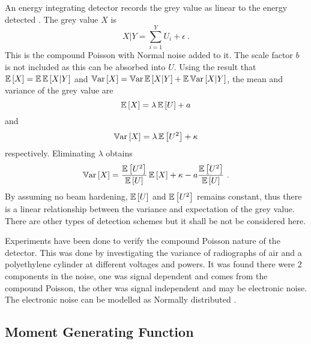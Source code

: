 An energy integrating detector records the grey value as linear to the energy detected \citep{whiting2006properties}. The grey value $X$ is
\begin{equation}
X|Y = \sum_{i=1}^Y U_i + \epsilon \ .
\end{equation}
This is the compound Poisson with Normal noise added to it. The scale factor $b$ is not included as this can be absorbed into $U$. Using the result that $\operatorname{\mathbb{E}}\left[X\right]=\operatorname{\mathbb{E}}\operatorname{\mathbb{E}}\left[X|Y\right]$ and $\operatorname{\mathbb{V}ar}\left[X\right] = \operatorname{\mathbb{V}ar}\operatorname{\mathbb{E}}\left[X|Y\right] + \operatorname{\mathbb{E}}\operatorname{\mathbb{V}ar}\left[X|Y\right]$, the mean and variance of the grey value are
\begin{equation}
\operatorname{\mathbb{E}}\left[X\right] = \lambda\operatorname{\mathbb{E}}\left[U\right]+a
\end{equation}
and
\begin{equation}
\operatorname{\mathbb{V}ar}\left[X\right] = \lambda \operatorname{\mathbb{E}}\left[U^2\right]+\kappa
\end{equation}
respectively. Eliminating $\lambda$ obtains
\begin{equation}
\variance\left[X\right] = \dfrac{\expectation\left[U^2\right]}{\expectation\left[U\right]} \expectation\left[X\right] + \kappa - a\dfrac{\expectation\left[U^2\right]}{\expectation\left[U\right]} \ .
\end{equation}
By assuming no beam hardening, $\operatorname{\mathbb{E}}\left[U\right]$ and $\operatorname{\mathbb{E}}\left[U^2\right]$ remains constant, thus there is a linear relationship between the variance and expectation of the grey value. There are other types of detection schemes \citep{whiting2006properties} but it shall be not be considered here.

Experiments have been done to verify the compound Poisson nature of the detector. This was done by investigating the variance of radiographs of air \citep{hsieh2015compound} and a polyethylene cylinder \citep{yang2009evaluation, yang2010noise} at different voltages and powers. It was found there were 2 components in the noise, one was signal dependent and comes from the compound Poisson, the other was signal independent and may be electronic noise. The electronic noise can be modelled as Normally distributed \citep{xu2009electronic}.

\subsection{Moment Generating Function}


